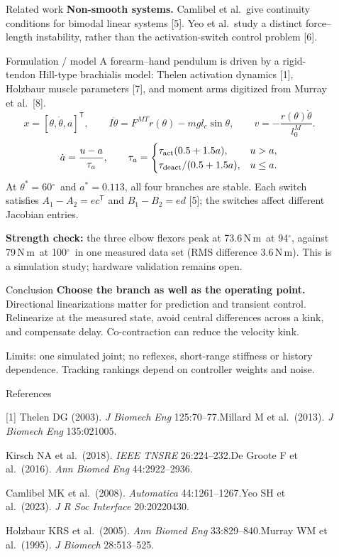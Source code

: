 \documentclass[final]{beamer}
\newlength{\sepwidth}
\newlength{\colwidth}
\newcommand{\separatorcolumn}{\begin{column}{\sepwidth}
\end{column}}
\newcommand{\chip}[1]{%
  \tikz[baseline=(n.base)]{\node[fill=accent,text=white,rounded corners=1.2mm,
    inner xsep=2.4mm,inner ysep=1.0mm,font=\bfseries](n){#1};}\hspace{0.6ex}}
\newcommand{\dg}{$^\circ$}
\newcommand{\Nm}{N\,m}
\newcommand{\aside}[1]{{\small\color{muted}#1}}
\begin{document}
\begin{frame}[t]
\begin{columns}[t]
\begin{column}{\colwidth}
\begin{block}{\chip{3} Related work}
\textbf{Non-smooth systems.} Camlibel et al.\ give continuity conditions for
bimodal linear systems [5]. Yeo et al.\ study a distinct force--length
instability, rather than the activation-switch control problem [6].
\end{block}

\begin{block}{\chip{4} Formulation / model}
A forearm--hand pendulum is driven by a rigid-tendon Hill-type brachialis
model: Thelen activation dynamics [1], Holzbaur muscle parameters [7], and
moment arms digitized from Murray et al.\ [8].
\[
 x=[\theta,\dot\theta,a]^{\mathsf T},\qquad
 I\ddot\theta=F^{MT}r(\theta)-mgl_c\sin\theta,\qquad
 v=-\frac{r(\theta)\dot\theta}{l_0^M}.
\]
\[
 \dot a=\frac{u-a}{\tau_a},\qquad
 \tau_a=\begin{cases}
 \tau_{\rm act}(0.5+1.5a),&u>a,\\
 \tau_{\rm deact}/(0.5+1.5a),&u\le a.
 \end{cases}
\]
At $\theta^\ast=60$\dg\ and $a^\ast=0.113$, all four branches are stable.
Each switch satisfies $A_1-A_2=ec^{\mathsf T}$ and $B_1-B_2=ed$ [5]; the
switches affect different Jacobian entries.

\textbf{Strength check:} the three elbow flexors peak at 73.6\,\Nm\ at 94\dg,
against 79\,\Nm\ at 100\dg\ in one measured data set (RMS difference
3.6\,\Nm). This is a simulation study; hardware validation remains open.
\end{block}
\begin{alertblock}{\chip{9} Conclusion}
\textbf{Choose the branch as well as the operating point.}
Directional linearizations matter for prediction and transient control.
Relinearize at the measured state, avoid central differences across a kink,
and compensate delay. Co-contraction can reduce the velocity kink.

\aside{Limits: one simulated joint; no reflexes, short-range stiffness or
history dependence. Tracking rankings depend on controller weights and noise.}
\end{alertblock}

\begin{exampleblock}{References}
{\small
[1] Thelen DG (2003). \emph{J Biomech Eng} 125:70--77.\quad
[2] Millard M et al.\ (2013). \emph{J Biomech Eng} 135:021005.\par
[3] Kirsch NA et al.\ (2018). \emph{IEEE TNSRE} 26:224--232.\quad
[4] De Groote F et al.\ (2016). \emph{Ann Biomed Eng} 44:2922--2936.\par
[5] Camlibel MK et al.\ (2008). \emph{Automatica} 44:1261--1267.\quad
[6] Yeo SH et al.\ (2023). \emph{J R Soc Interface} 20:20220430.\par
[7] Holzbaur KRS et al.\ (2005). \emph{Ann Biomed Eng} 33:829--840.\quad
[8] Murray WM et al.\ (1995). \emph{J Biomech} 28:513--525.\par}
\end{exampleblock}
\end{column}
\separatorcolumn
\begin{column}{\colwidth}


\end{column}
\end{columns}
\end{frame}
\end{document}
